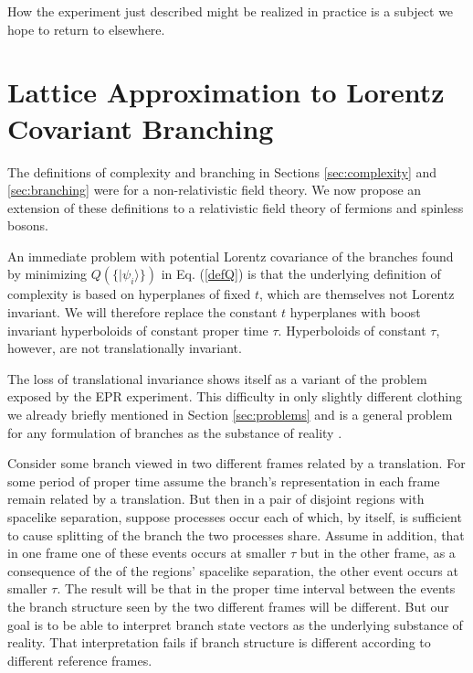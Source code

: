 \documentclass[twocolumn,amsmath,amssymb]{revtex4-1}
\begin{document}
How the experiment just described
might be realized in practice is
a subject we hope to return to elsewhere.


\section{\label{sec:relativistic}  Lattice Approximation to Lorentz Covariant Branching}

The definitions of complexity and branching 
in Sections \ref{sec:complexity} and \ref{sec:branching}
were for a non-relativistic field theory.
We now propose an extension of these definitions
to a relativistic field theory of fermions and spinless bosons.

An immediate problem with potential Lorentz covariance of the
branches found by minimizing $Q(\{|\psi_i \rangle \})$ in Eq. (\ref{defQ})
is that the underlying definition of complexity is based
on hyperplanes of fixed $t$, which are themselves not Lorentz
invariant.
We will therefore replace the constant $t$ hyperplanes
with boost invariant hyperboloids of constant
proper time $\tau$.
Hyperboloids of constant $\tau$, however, are
not translationally invariant.  

The loss of translational invariance
shows itself as
a variant of the problem exposed by the EPR experiment.
This difficulty in only slightly different clothing 
we already briefly mentioned in Section \ref{sec:problems} and is a general problem for any formulation 
of branches as the substance of reality \cite{Zeh, Zurek, Zurek1, Zurek2,  Wallace, Riedel}.

Consider some branch
viewed in two different frames related by a translation.
For some period of proper time assume the branch's
representation 
in each frame remain related by a translation.
But then in a pair of disjoint regions with
spacelike separation, suppose processes occur each of which,
by itself, is sufficient to cause splitting of the branch
the two processes share. Assume in addition, that in one
frame one of these events occurs at smaller $\tau$ but 
in the other frame, as a consequence of the 
of the regions' spacelike separation, the other event occurs at smaller $\tau$.
The result will be that in the proper time interval between the
events the branch structure seen by the two different 
frames will be different. But our goal is to be able
to interpret branch state vectors as the underlying 
substance of reality. That interpretation
fails if branch structure is different
according to different reference frames.
\end{document}
